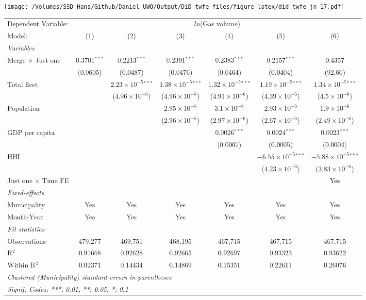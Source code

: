 \documentclass[
]{article}
\begin{document}
\texttt{[image: /Volumes/SSD Hans/Github/Daniel\_UWO/Output/DiD\_twfe\_files/figure-latex/did\_twfe\_jn-17.pdf]}

\begin{tabular}{lcccccc}
\tabularnewline\midrule\midrule
Dependent Variable:&\multicolumn{6}{c}{$ln$(Gas volume)}\\
Model:&(1) & (2) & (3) & (4) & (5) & (6)\\
\midrule \emph{Variables}&   &   &   &   &   &  \\
Merge $\times $ Just one & 0.3701$^{***}$ & 0.2213$^{***}$ & 0.2391$^{***}$ & 0.2383$^{***}$ & 0.2157$^{***}$ & 0.4357\\
  &(0.0605) & (0.0487) & (0.0476) & (0.0464) & (0.0404) & (92.60)\\
Total fleet &    & $2.23\times 10^{-5}$$^{***}$ & $1.38\times 10^{-5}$$^{***}$ & $1.32\times 10^{-5}$$^{***}$ & $1.19\times 10^{-5}$$^{***}$ & $1.34\times 10^{-5}$$^{***}$\\
  &   & ($4.96\times 10^{-6}$) & ($4.96\times 10^{-6}$) & ($4.91\times 10^{-6}$) & ($4.39\times 10^{-6}$) & ($4.5\times 10^{-6}$)\\
Population &    &    & $2.95\times 10^{-6}$ & $3.1\times 10^{-6}$ & $2.93\times 10^{-6}$ & $1.9\times 10^{-6}$\\
  &   &    & ($2.96\times 10^{-6}$) & ($2.97\times 10^{-6}$) & ($2.67\times 10^{-6}$) & ($2.49\times 10^{-6}$)\\
GDP per capita &    &    &    & 0.0026$^{***}$ & 0.0024$^{***}$ & 0.0023$^{***}$\\
  &   &    &    & (0.0007) & (0.0005) & (0.0004)\\
HHI &    &    &    &    & $-6.55\times 10^{-5}$$^{***}$ & $-5.88\times 10^{-5}$$^{***}$\\
  &   &    &    &    & ($4.23\times 10^{-6}$) & ($3.83\times 10^{-6}$)\\
Just one $\times$ Time FE &  &  &  &  &  & Yes\\
\midrule \emph{Fixed-effects}&   &   &   &   &   &  \\
Municipality & Yes & Yes & Yes & Yes & Yes & Yes\\
Month-Year & Yes & Yes & Yes & Yes & Yes & Yes\\
\midrule \emph{Fit statistics}&  & & & & & \\
Observations & 479,277&469,751&468,195&467,715&467,715&467,715\\
R$^2$ & 0.91668&0.92628&0.92665&0.92697&0.93323&0.93622\\
Within R$^2$ & 0.02371&0.14434&0.14869&0.15351&0.22611&0.26076\\
\midrule\midrule\multicolumn{7}{l}{\emph{Clustered (Municipality) standard-errors in parentheses}}\\
\multicolumn{7}{l}{\emph{Signif. Codes: ***: 0.01, **: 0.05, *: 0.1}}\\
\end{tabular}
\end{document}
